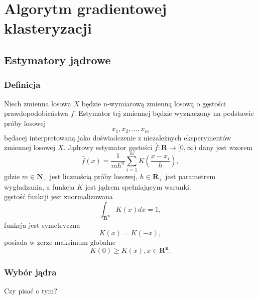 \chapter{Algorytm gradientowej klasteryzacji}
\label{cha:gradient_clustering_algorithm}

\section{Estymatory jądrowe}
\label{sec:estymatory}
\subsection{Definicja}

Niech zmienna losowa $X$ będzie n-wymiarową zmienną losową o gęstości prawdopodobieństwa $f$. Estymator tej zmiennej będzie wyznaczony na podstawie próby losowej
\begin{equation}
x_1, x_2, ..., x_m
\end{equation}
będacej interpretowaną jako doświadczenie z niezależnych eksperymentów zmiennej losowej $X$.
Jądrowy estymator gęstości $\hat{f}: \mathbf{R} \to [0, \infty)$ dany jest wzorem
\begin{equation}
\label{eq:estymator}
\hat{f}(x)=\frac{1}{mh^n} \displaystyle \sum_{i=1}^{m}K(\frac{x-x_i}{h}),
\end{equation}
gdzie $m \in \mathbf{N_+}$ jest licznością próby losowej, $h \in \mathbf{R_+}$ jest parametrem wygładzania, a funkcja $K$ jest jądrem spełniającym warunki: \\
gęstość funkcji jest znormalizowana
\begin{equation}
\int_{\mathbf{R^n}} K(x)dx = 1,
\end{equation}
funkcja jest symetryczna
\begin{equation}
K(x) = K(-x),
\end{equation}
posiada w zerze maksimum globalne
\begin{equation}
K(0) \geq K(x), x \in \mathbf{R^n}.
\end{equation}

\subsection{Wybór jądra}
Czy pisać o tym?

